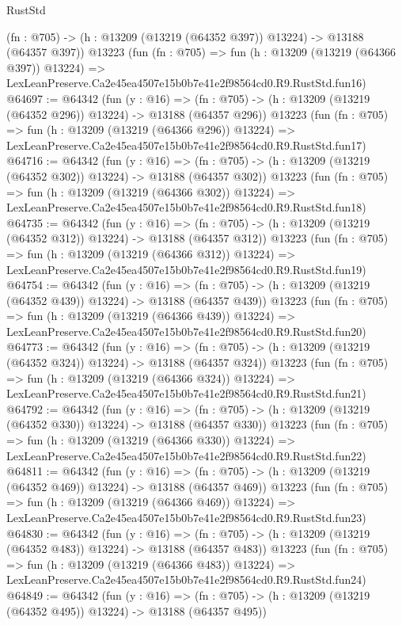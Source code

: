 \begin{lexlean}{RustStd}
\begin{coremodule}
    (fn : @705) -> (h : @13209 (@13219 (@64352 @397)) @13224) -> @13188 (@64357 @397))
    @13223
    (fun (fn : @705) =>
    fun (h : @13209 (@13219 (@64366 @397)) @13224) =>
    LexLeanPreserve.Ca2e45ea4507e15b0b7e41e2f98564cd0.R9.RustStd.fun16)
@64697 := @64342
    (fun (y : @16) =>
    (fn : @705) -> (h : @13209 (@13219 (@64352 @296)) @13224) -> @13188 (@64357 @296))
    @13223
    (fun (fn : @705) =>
    fun (h : @13209 (@13219 (@64366 @296)) @13224) =>
    LexLeanPreserve.Ca2e45ea4507e15b0b7e41e2f98564cd0.R9.RustStd.fun17)
@64716 := @64342
    (fun (y : @16) =>
    (fn : @705) -> (h : @13209 (@13219 (@64352 @302)) @13224) -> @13188 (@64357 @302))
    @13223
    (fun (fn : @705) =>
    fun (h : @13209 (@13219 (@64366 @302)) @13224) =>
    LexLeanPreserve.Ca2e45ea4507e15b0b7e41e2f98564cd0.R9.RustStd.fun18)
@64735 := @64342
    (fun (y : @16) =>
    (fn : @705) -> (h : @13209 (@13219 (@64352 @312)) @13224) -> @13188 (@64357 @312))
    @13223
    (fun (fn : @705) =>
    fun (h : @13209 (@13219 (@64366 @312)) @13224) =>
    LexLeanPreserve.Ca2e45ea4507e15b0b7e41e2f98564cd0.R9.RustStd.fun19)
@64754 := @64342
    (fun (y : @16) =>
    (fn : @705) -> (h : @13209 (@13219 (@64352 @439)) @13224) -> @13188 (@64357 @439))
    @13223
    (fun (fn : @705) =>
    fun (h : @13209 (@13219 (@64366 @439)) @13224) =>
    LexLeanPreserve.Ca2e45ea4507e15b0b7e41e2f98564cd0.R9.RustStd.fun20)
@64773 := @64342
    (fun (y : @16) =>
    (fn : @705) -> (h : @13209 (@13219 (@64352 @324)) @13224) -> @13188 (@64357 @324))
    @13223
    (fun (fn : @705) =>
    fun (h : @13209 (@13219 (@64366 @324)) @13224) =>
    LexLeanPreserve.Ca2e45ea4507e15b0b7e41e2f98564cd0.R9.RustStd.fun21)
@64792 := @64342
    (fun (y : @16) =>
    (fn : @705) -> (h : @13209 (@13219 (@64352 @330)) @13224) -> @13188 (@64357 @330))
    @13223
    (fun (fn : @705) =>
    fun (h : @13209 (@13219 (@64366 @330)) @13224) =>
    LexLeanPreserve.Ca2e45ea4507e15b0b7e41e2f98564cd0.R9.RustStd.fun22)
@64811 := @64342
    (fun (y : @16) =>
    (fn : @705) -> (h : @13209 (@13219 (@64352 @469)) @13224) -> @13188 (@64357 @469))
    @13223
    (fun (fn : @705) =>
    fun (h : @13209 (@13219 (@64366 @469)) @13224) =>
    LexLeanPreserve.Ca2e45ea4507e15b0b7e41e2f98564cd0.R9.RustStd.fun23)
@64830 := @64342
    (fun (y : @16) =>
    (fn : @705) -> (h : @13209 (@13219 (@64352 @483)) @13224) -> @13188 (@64357 @483))
    @13223
    (fun (fn : @705) =>
    fun (h : @13209 (@13219 (@64366 @483)) @13224) =>
    LexLeanPreserve.Ca2e45ea4507e15b0b7e41e2f98564cd0.R9.RustStd.fun24)
@64849 := @64342
    (fun (y : @16) =>
    (fn : @705) -> (h : @13209 (@13219 (@64352 @495)) @13224) -> @13188 (@64357 @495))

\end{coremodule}
\end{lexlean}
